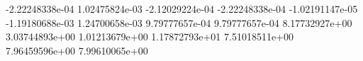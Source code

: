  -2.22248338e-04
 1.02475824e-03
 -2.12029224e-04
 -2.22248338e-04
 -1.02191147e-05
 -1.19180688e-03
 1.24700658e-03
 9.79777657e-04
 9.79777657e-04
 8.17732927e+00
 3.03744893e+00
 1.01213679e+00
 1.17872793e+01
 7.51018511e+00
 7.96459596e+00
 7.99610065e+00

